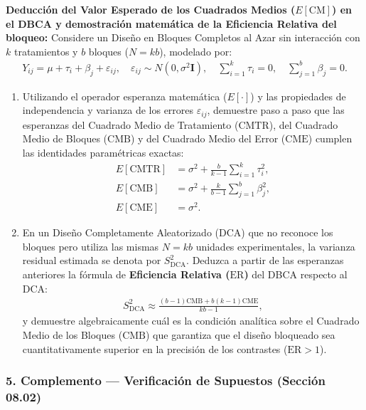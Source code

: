 \begin{problema}
	\label{prob:anova_desaf_esperanzas_dbca}
	\textbf{Deducción del Valor Esperado de los Cuadrados Medios ($E[\text{CM}]$) en el DBCA y demostración matemática de la Eficiencia Relativa del bloqueo:}
	Considere un Diseño en Bloques Completos al Azar sin interacción con $k$ tratamientos y $b$ bloques ($N = kb$), modelado por:
	\begin{align}
		Y_{ij} = \mu + \tau_i + \beta_j + \varepsilon_{ij}, \quad \varepsilon_{ij} \sim N(0, \sigma^2 \mathbf{I}), \quad \sum_{i=1}^k \tau_i = 0, \quad \sum_{j=1}^b \beta_j = 0.
	\end{align}
	\begin{enumerate}
		\item Utilizando el operador esperanza matemática ($E[\cdot]$) y las propiedades de independencia y varianza de los errores $\varepsilon_{ij}$, demuestre paso a paso que las esperanzas del Cuadrado Medio de Tratamiento ($\text{CMTR}$), del Cuadrado Medio de Bloques ($\text{CMB}$) y del Cuadrado Medio del Error ($\text{CME}$) cumplen las identidades paramétricas exactas:
		\begin{align}
			E[\text{CMTR}] &= \sigma^2 + \frac{b}{k-1}\sum_{i=1}^k \tau_i^2, \\
			E[\text{CMB}] &= \sigma^2 + \frac{k}{b-1}\sum_{j=1}^b \beta_j^2, \\
			E[\text{CME}] &= \sigma^2.
		\end{align}
		\item En un Diseño Completamente Aleatorizado (DCA) que no reconoce los bloques pero utiliza las mismas $N = kb$ unidades experimentales, la varianza residual estimada se denota por $S_{\text{DCA}}^2$. Deduzca a partir de las esperanzas anteriores la fórmula de \textbf{Eficiencia Relativa ($\text{ER}$)} del DBCA respecto al DCA:
		\begin{align}
			S_{\text{DCA}}^2 \approx \frac{(b-1)\text{CMB} + b(k-1)\text{CME}}{kb - 1},
		\end{align}
		y demuestre algebraicamente cuál es la condición analítica sobre el Cuadrado Medio de los Bloques ($\text{CMB}$) que garantiza que el diseño bloqueado sea cuantitativamente superior en la precisión de los contrastes ($\text{ER} > 1$).
	\end{enumerate}
\end{problema}


\subsubsection*{5. Complemento --- Verificación de Supuestos (Sección 08.02)}

